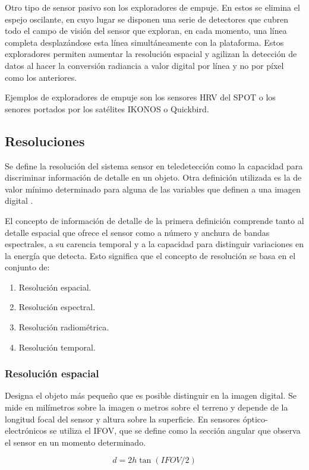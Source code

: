 Otro tipo de sensor pasivo son los exploradores de empuje. En estos se elimina el espejo oscilante, en cuyo lugar se disponen una serie de detectores que cubren todo el campo de visión del sensor que exploran, en cada momento, una línea completa desplazándose esta línea simultáneamente con la plataforma. Estos exploradores permiten aumentar la resolución espacial y agilizan la detección de datos al hacer la conversión radiancia a valor digital por línea y no por píxel como los anteriores.%

Ejemplos de exploradores de empuje son los sensores \ac{HRV} del SPOT o los senores portados por los satélites IKONOS o Quickbird.

\subsection{Resoluciones}
Se define la resolución del sistema sensor en teledetección como la capacidad para discriminar información de detalle en un objeto. Otra definición utilizada es la de valor mínimo determinado para alguna de las variables que definen a una imagen digital \citep{chuvieco2002teledeteccion} .%

El concepto de información de detalle de la primera definición comprende tanto al detalle espacial que ofrece el sensor como a número y anchura de bandas espectrales, a su carencia temporal y a la capacidad para distinguir variaciones en la energía que detecta. Esto significa que el concepto de resolución se basa en el conjunto de:
\begin{enumerate}
	\item Resolución espacial.
	\item Resolución espectral.
	\item Resolución radiométrica.
	\item Resolución temporal.
\end{enumerate}

\subsubsection{Resolución espacial}
Designa el objeto más pequeño que es posible distinguir en la imagen digital. Se mide en milímetros sobre la imagen o metros sobre el terreno y depende de la longitud focal del sensor y altura sobre la superficie. En sensores óptico-electrónicos se utiliza el \ac{IFOV}, que se define como la sección angular que observa el sensor en un momento determinado.

\begin{equation}
	d=2h\tan(IFOV/2)
	\label{eq:res_esp}
\end{equation}

